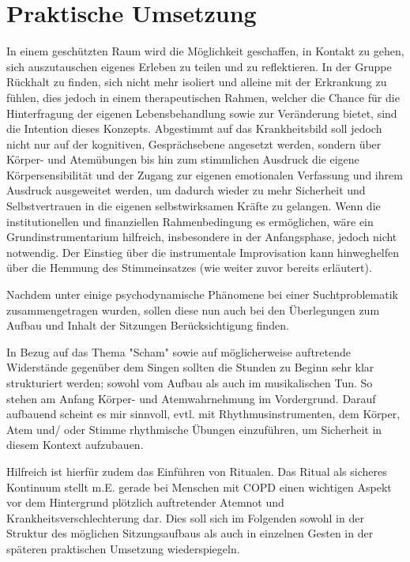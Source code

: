 \section{Praktische Umsetzung}
In einem geschützten Raum wird die Möglichkeit geschaffen, in Kontakt zu gehen, sich auszutauschen eigenes Erleben zu teilen und zu reflektieren. In der Gruppe Rückhalt zu finden, sich nicht mehr isoliert und alleine mit der Erkrankung zu fühlen, dies jedoch in einem therapeutischen Rahmen, welcher die Chance für die Hinterfragung der eigenen Lebensbehandlung sowie zur Veränderung bietet, sind die Intention dieses Konzepts. Abgestimmt auf das Krankheitsbild soll jedoch nicht nur auf der kognitiven, Gesprächsebene angesetzt werden, sondern über Körper- und Atemübungen bis hin zum stimmlichen Ausdruck die eigene Körpersensibilität und der Zugang zur eigenen emotionalen Verfassung und ihrem Ausdruck ausgeweitet werden, um dadurch wieder zu mehr Sicherheit und Selbstvertrauen in die eigenen selbstwirksamen Kräfte zu gelangen. Wenn die institutionellen und finanziellen Rahmenbedingung es ermöglichen, wäre ein Grundinstrumentarium hilfreich, insbesondere in der Anfangsphase, jedoch nicht notwendig. Der Einstieg über die instrumentale Improvisation kann hinweghelfen über die Hemmung des Stimmeinsatzes (wie weiter zuvor bereits erläutert).  

Nachdem unter \label{psychodynamische ueberlegungen} einige psychodynamische Phänomene bei einer Suchtproblematik zusammengetragen wurden, sollen diese nun auch bei den Überlegungen zum Aufbau und Inhalt der Sitzungen Berücksichtigung finden. 

In Bezug auf das Thema "Scham" sowie auf möglicherweise auftretende Widerstände gegenüber dem Singen sollten die Stunden zu Beginn sehr klar strukturiert werden; sowohl vom Aufbau als auch im musikalischen Tun. So stehen am Anfang Körper- und Atemwahrnehmung im Vordergrund. Darauf aufbauend scheint es mir sinnvoll, evtl. mit Rhythmusinstrumenten, dem Körper, Atem und/ oder Stimme rhythmische Übungen einzuführen, um Sicherheit in diesem Kontext aufzubauen. 

Hilfreich ist hierfür zudem das Einführen von Ritualen. Das Ritual als sicheres Kontinuum stellt m.E. gerade bei Menschen mit COPD  einen wichtigen Aspekt vor dem Hintergrund plötzlich auftretender Atemnot und Krankheitsverschlechterung dar. Dies soll sich im Folgenden sowohl in der Struktur des möglichen Sitzungsaufbaus als auch in einzelnen Gesten in der späteren praktischen Umsetzung wiederspiegeln.

